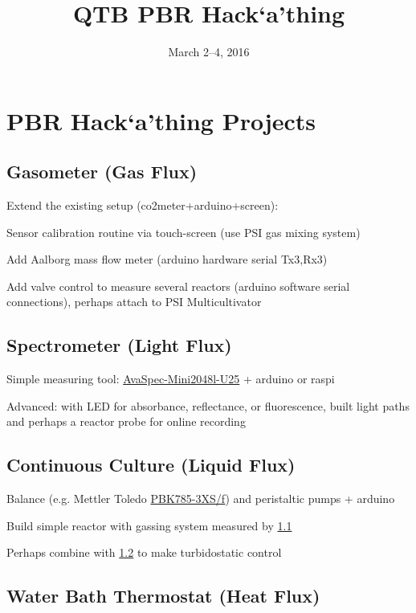 \documentclass[12pt,a4paper]{article}
\title{QTB PBR Hack`a'thing}
\date{March 2--4, 2016}
\begin{document}
\maketitle
\scriptsize
\tableofcontents
\normalsize
\newpage

\section{PBR Hack`a'thing Projects}
\label{proj}

\subsection{Gasometer (Gas Flux)}
\label{gas}

Extend the existing setup (co2meter+arduino+screen): 

Sensor calibration routine via touch-screen (use PSI gas mixing system) 

Add Aalborg mass flow meter (arduino hardware serial Tx3,Rx3)  

Add valve control to measure several reactors (arduino software serial
connections), perhaps attach to PSI Multicultivator

\subsection{Spectrometer (Light Flux)} 
\label{spec}

Simple measuring tool: \href{http://www.avantes.com/products/spectrometers/compactline/item/723-avaspec-mini}{AvaSpec-Mini2048l-U25} + arduino or raspi

Advanced: with LED for absorbance, reflectance, or fluorescence,
built light paths and perhaps a reactor probe for online recording

\subsection{Continuous Culture (Liquid Flux)} 
\label{cult}

Balance (e.g. Mettler Toledo \href{http://de.mt.com/de/de/home/products/Industrial_Weighing_Solutions/bench-scales/weighing-platforms/high-resolution/PBK785.html}{PBK785-3XS/f}) and peristaltic pumps + arduino

Build simple reactor with gassing system measured by \ref{gas}

Perhaps combine with \ref{spec} to make turbidostatic control

\subsection{Water Bath Thermostat (Heat Flux)}
\label{heat}
\end{document}
